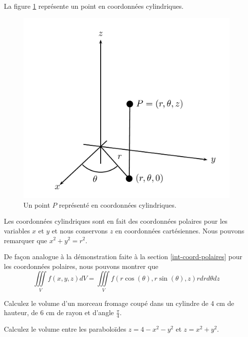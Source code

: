 \documentclass[]{book}
\theoremstyle{definition}
\theoremstyle{definition}
\theoremstyle{definition}
\theoremstyle{remark}
\let\BeginKnitrBlock\begin \let\EndKnitrBlock\end
\begin{document}
La figure \ref{fig:coordcylindriques} représente un point en coordonnées
cylindriques.

\begin{figure}

{\centering \includegraphics[width=0.75\linewidth]{resources/images/latex/coordcylindriques} 

}

\caption{Un point $P$ représenté en coordonnées cylindriques.}\label{fig:coordcylindriques}
\end{figure}

\BeginKnitrBlock{remark}
{}Les coordonnées cylindriques sont en fait
des coordonnées polaires pour les variables \(x\) et \(y\) et nous
conservons \(z\) en coordonnées cartésiennes. Nous pouvons remarquer que
\(x^2+y^2=r^2\).
\EndKnitrBlock{remark}

De façon analogue à la démonstration faite à la section
\ref{int-coord-polaires} pour les coordonnées polaires, nous pouvons
montrer que
\[\iiint\limits_V f(x,y,z)dV=\iiint\limits_V f(r\cos(\theta),r\sin(\theta) ,z) r drd\theta dz\]

\BeginKnitrBlock{example}
\protect\hypertarget{exm:unnamed-chunk-280}{}{\label{exm:unnamed-chunk-280}
}Calculez le volume d'un morceau fromage coupé dans un cylindre de 4 cm
de hauteur, de 6 cm de rayon et d'angle \(\frac{\pi}{4}\).
\EndKnitrBlock{example}
\vspace*{5cm}

\BeginKnitrBlock{example}
\protect\hypertarget{exm:unnamed-chunk-281}{}{\label{exm:unnamed-chunk-281}
}Calculez le volume entre les paraboloïdes \(z=4-x^2-y^2\) et
\(z=x^2+y^2\).
\EndKnitrBlock{example}
\vspace*{8cm}
\end{document}
